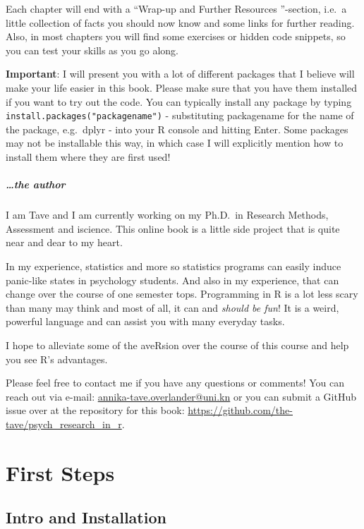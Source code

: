 \documentclass[
]{book}
\begin{document}
Each chapter will end with a ``Wrap-up and Further Resources ''-section, i.e.~a little collection of facts you should now know and some links for further reading.
Also, in most chapters you will find some exercises or hidden code snippets, so you can test your skills as you go along.

\textbf{Important}: I will present you with a lot of different packages that I believe will make your life easier in this book.
Please make sure that you have them installed if you want to try out the code.
You can typically install any package by typing \texttt{install.packages("packagename")} - substituting packagename for the name of the package, e.g.~dplyr - into your R console and hitting Enter.
Some packages may not be installable this way, in which case I will explicitly mention how to install them where they are first used!

\subsubsection*{\ldots the author}\label{the-author}

I am Tave and I am currently working on my Ph.D.~in Research Methods, Assessment and iscience.
This online book is a little side project that is quite near and dear to my heart.

In my experience, statistics and more so statistics programs can easily induce panic-like states in psychology students.
And also in my experience, that can change over the course of one semester tops.
Programming in R is a lot less scary than many may think and most of all, it can and \emph{should be fun}!
It is a weird, powerful language and can assist you with many everyday tasks.

I hope to alleviate some of the aveRsion over the course of this course and help you see R's advantages.

Please feel free to contact me if you have any questions or comments! You can reach out via e-mail: \url{annika-tave.overlander@uni.kn} or you can submit a GitHub issue over at the repository for this book: \url{https://github.com/the-tave/psych_research_in_r}.

\part{First Steps}\label{part-first-steps}

\chapter{Intro and Installation}\label{intro-and-installation}
\end{document}

